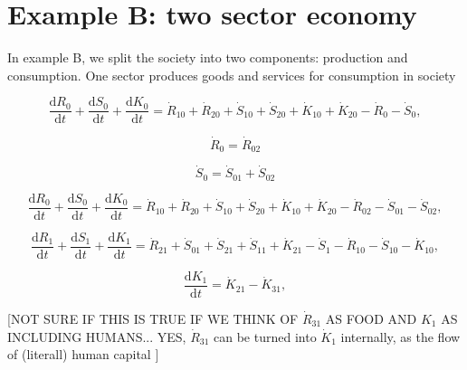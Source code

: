 \section{Example B: two sector economy}
\label{sec:B_materials}

In example B, we split the society into two components: production and consumption. One sector produces goods and services for consumption in society

\begin{equation} \label{eq:B-CV_R_dot_0a}
	\frac{\mathrm{d}R_{0}}{\mathrm{d}t} 
	+ \frac{\mathrm{d}S_{0}}{\mathrm{d}t}	
	+ \frac{\mathrm{d}K_0}{\mathrm{d}t}
	=  \dot{R}_{10} + \dot{R}_{20} 
	+ \dot{S}_{10} + \dot{S}_{20} 
	+ \dot{K}_{10} + \dot{K}_{20} 
	- \dot{R}_{0} 
	- \dot{S}_{0},
\end{equation}

\begin{equation}
	\dot{R}_{0} = \dot{R}_{02}
\end{equation}

\begin{equation}
	\dot{S}_{0} = \dot{S}_{01} + \dot{S}_{02}
\end{equation}

\begin{equation} \label{eq:B-CV_R_dot_0b}
	\frac{\mathrm{d}R_{0}}{\mathrm{d}t} 
	+ \frac{\mathrm{d}S_{0}}{\mathrm{d}t}	 
	+ \frac{\mathrm{d}K_0}{\mathrm{d}t}
	=  \dot{R}_{10} + \dot{R}_{20} 
	+ \dot{S}_{10} + \dot{S}_{20} 
	+ \dot{K}_{10} + \dot{K}_{20} 
	- \dot{R}_{02} 
	- \dot{S}_{01} - \dot{S}_{02},
\end{equation}

\begin{equation} \label{eq:B-CV_R_dot_1}
	\frac{\mathrm{d}R_{1}}{\mathrm{d}t} + \frac{\mathrm{d}S_{1}}{\mathrm{d}t}
	+ \frac{\mathrm{d}K_{1}}{\mathrm{d}t}
	=  \dot{R}_{21} 
	+ \dot{S}_{01} + \dot{S}_{21} + \dot{S}_{11}
	+ \dot{K}_{21}
	- \dot{S}_{1} 
	- \dot{R}_{10} 
	- \dot{S}_{10} 
	- \dot{K}_{10},
\end{equation}

\begin{equation} \label{eq:B-CV_K_dot_1}
	\frac{\mathrm{d}K_{1}}{\mathrm{d}t}
	=  \dot{K}_{21} - \dot{K}_{31},
\end{equation}

[NOT SURE IF THIS IS TRUE IF WE THINK OF $\dot{R}_{31}$ AS FOOD AND $K_{1}$ AS INCLUDING HUMANS... YES, $\dot{R}_{31}$ can be turned into $\dot{K}_{1}$ internally, as the flow of (literall) human capital ]

